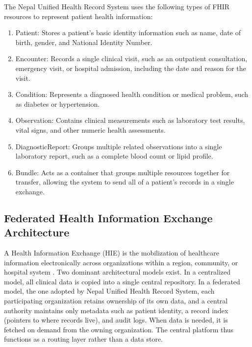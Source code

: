 \documentclass[12pt]{report}
\numberwithin{equation}{chapter}
\begin{document}
The Nepal Unified Health Record System uses the following types of FHIR resources to represent patient health information:
\begin{enumerate}
    \item Patient: Stores a patient's basic identity information such as name, date of birth, gender, and National Identity Number.
    \item Encounter: Records a single clinical visit, such as an outpatient consultation, emergency visit, or hospital admission, including the date and reason for the visit.
    \item Condition: Represents a diagnosed health condition or medical problem, such as diabetes or hypertension.
    \item Observation: Contains clinical measurements such as laboratory test results, vital signs, and other numeric health assessments.
    \item DiagnosticReport: Groups multiple related observations into a single laboratory report, such as a complete blood count or lipid profile.
    \item Bundle: Acts as a container that groups multiple resources together for transfer, allowing the system to send all of a patient's records in a single exchange.
\end{enumerate}

\subsection{Federated Health Information Exchange Architecture}
A Health Information Exchange (HIE) is the mobilization of healthcare information electronically across organizations within a region, community, or hospital system \cite{dixon}. Two dominant architectural models exist. In a centralized model, all clinical data is copied into a single central repository. In a federated model, the one adopted by Nepal Unified Health Record System, each participating organization retains ownership of its own data, and a central authority maintains only metadata such as patient identity, a record index (pointers to where records live), and audit logs. When data is needed, it is fetched on demand from the owning organization. The central platform thus functions as a routing layer rather than a data store.
\end{document}
